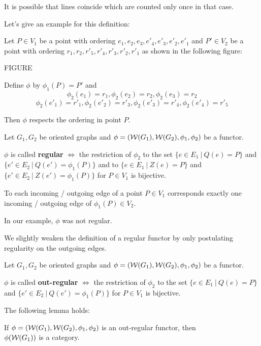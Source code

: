 It is possible that lines coincide which are counted only once in that case.

Let's give an example for this definition:

Let $P \in V_1$ be a point with ordering $e_1, e_2, e_3, e'_4, e'_3, e'_2,
e'_1$ and $P' \in V_2$ be a point with ordering $r_1, r_2, r'_5,
r'_4, r'_3, r'_2, r'_1$ as shown in the following figure:

FIGURE

Define $\phi$ by $\phi_1(P) = P'$ and 
\[ \phi_2(e_1) = r_1, \phi_2(e_2) = r_2, \phi_2(e_3) = r_2 \]
\[ \phi_2(e'_1) = r'_1, \phi_2(e'_2) = r'_3, \phi_2(e'_3) = r'_4, \phi_2(e'_4) = r'_5 \]

Then $\phi$ respects the ordering in point $P$.

\begin{definition}
Let $G_1, G_2$ be oriented graphs and $\phi = (\mbox{$\mathcal{W}(G_1)$}, \mbox{$\mathcal{W}(G_2)$},
\phi_1, \phi_2)$ be a functor.

$\phi$ is called {\bf regular} $\Leftrightarrow$ the restriction of $\phi_2$
to the set $\{ e \in E_1\ |\ Q(e) = P \}$ and $\{ e' \in E_2\ |\ Q(e') = \phi_1(P) \}$ and to $\{
e \in E_1\ |\ Z(e) = P \}$ and $\{ e' \in E_2\ |\ Z(e') = \phi_1(P) \}$ for $P
\in V_1$ is bijective.
\end{definition}

To each incoming / outgoing edge of a point $P \in V_1$ corresponds exactly
one incoming / outgoing edge of $\phi_1(P) \in V_2$.

In our example, $\phi$ was not regular.

We slightly weaken the definition of a regular functor by only postulating
regularity on the outgoing edges.

\begin{definition}
Let $G_1, G_2$ be oriented graphs and $\phi = (\mbox{$\mathcal{W}(G_1)$}, \mbox{$\mathcal{W}(G_2)$},
\phi_1, \phi_2)$ be a functor.

$\phi$ is called {\bf out-regular} $\Leftrightarrow$ the restriction of $\phi_2$
to the set $\{ e \in E_1\ |\ Q(e) = P \}$ and $\{ e' \in E_2\ |\ Q(e') = \phi_1(P) \}$ for
$P \in V_1$ is bijective.
\end{definition}

The following lemma holds:

\begin{lemma}
If $\phi = (\mbox{$\mathcal{W}(G_1)$}, \mbox{$\mathcal{W}(G_2)$}, \phi_1, \phi_2)$ is an
out-regular functor, then \\ $\phi(\mbox{$\mathcal{W}(G_1)$})$ is a category.
\end{lemma}

